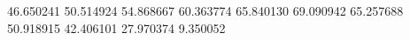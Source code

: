 46.650241
50.514924
54.868667
60.363774
65.840130
69.090942
65.257688
50.918915
42.406101
27.970374
9.350052

